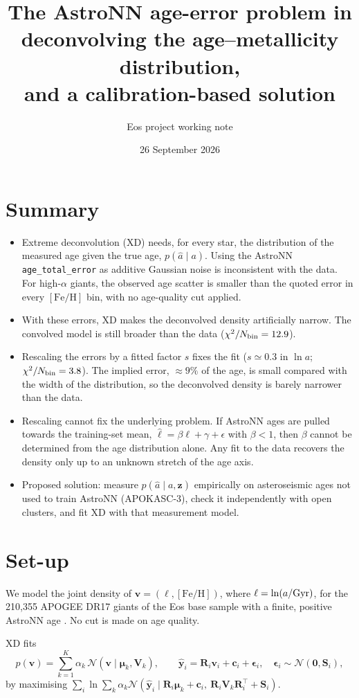 \documentclass[11pt,a4paper]{article}
\title{The AstroNN age-error problem in deconvolving the age--metallicity distribution,\\ and a calibration-based solution}
\author{Eos project working note}
\date{26 September 2026}
\newcommand{\feh}{\ensuremath{[\mathrm{Fe/H}]}}
\newcommand{\N}{\ensuremath{\mathcal{N}}}
\begin{document}
\maketitle

\section*{Summary}
\begin{itemize}
  \item Extreme deconvolution (XD) needs, for every star, the distribution of the measured age given the true age, $p(\hat a\mid a)$. Using the AstroNN \texttt{age\_total\_error} as additive Gaussian noise is inconsistent with the data. For high-$\alpha$ giants, the observed age scatter is smaller than the quoted error in every \feh{} bin, with no age-quality cut applied.
  \item With these errors, XD makes the deconvolved density artificially narrow. The convolved model is still broader than the data ($\chi^2/N_{\rm bin}=12.9$).
  \item Rescaling the errors by a fitted factor $s$ fixes the fit ($s\simeq0.3$ in $\ln a$; $\chi^2/N_{\rm bin}=3.8$). The implied error, $\approx9\%$ of the age, is small compared with the width of the distribution, so the deconvolved density is barely narrower than the data.
  \item Rescaling cannot fix the underlying problem. If AstroNN ages are pulled towards the training-set mean, $\hat\ell=\beta\ell+\gamma+\epsilon$ with $\beta<1$, then $\beta$ cannot be determined from the age distribution alone. Any fit to the data recovers the density only up to an unknown stretch of the age axis.
  \item Proposed solution: measure $p(\hat a\mid a,\bm z)$ empirically on asteroseismic ages not used to train AstroNN (APOKASC-3), check it independently with open clusters, and fit XD with that measurement model.
\end{itemize}

\section{Set-up}
We model the joint density of $\bm v=(\ell,\feh)$, where $\ell=\ln(a/{\rm Gyr})$, for the 210{,}355 APOGEE DR17 giants of the Eos base sample \citep{DR17} with a finite, positive AstroNN age \citep{Leung2019,Mackereth2019}. No cut is made on age quality.

XD \citep{Bovy2011} fits
\begin{equation}
p(\bm v)=\sum_{k=1}^{K}\alpha_k\,\N(\bm v\mid\bm\mu_k,\mathbf V_k),\qquad
\hat{\bm y}_i=\mathbf R_i\bm v_i+\bm c_i+\bm\epsilon_i,\quad \bm\epsilon_i\sim\N(\bm 0,\mathbf S_i),
\label{eq:xd}
\end{equation}
by maximising $\sum_i\ln\sum_k\alpha_k\N(\hat{\bm y}_i\mid\mathbf R_i\bm\mu_k+\bm c_i,\ \mathbf R_i\mathbf V_k\mathbf R_i^{\top}+\mathbf S_i)$.
\end{document}
